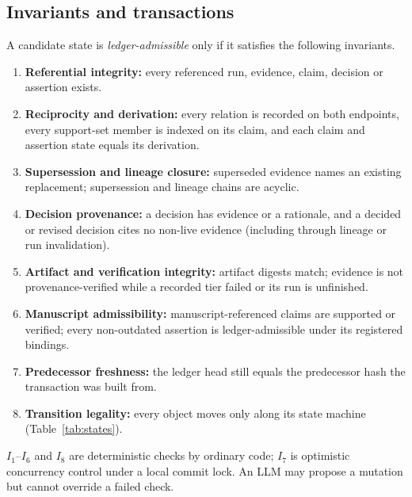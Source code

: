 \documentclass[cmc,article,submit,moreauthors,pdftex]{Definitions/tsp}
\begin{document}
\subsection{Invariants and transactions}
\label{sec:txn}
A candidate state is \emph{ledger-admissible} only if it satisfies the following invariants.
\begin{enumerate}
    \item[$I_1$] \textbf{Referential integrity:} every referenced run, evidence, claim, decision or assertion exists.
    \item[$I_2$] \textbf{Reciprocity and derivation:} every relation is recorded on both endpoints, every support-set member is indexed on its claim, and each claim and assertion state equals its derivation.
    \item[$I_3$] \textbf{Supersession and lineage closure:} superseded evidence names an existing replacement; supersession and lineage chains are acyclic.
    \item[$I_4$] \textbf{Decision provenance:} a decision has evidence or a rationale, and a decided or revised decision cites no non-live evidence (including through lineage or run invalidation).
    \item[$I_5$] \textbf{Artifact and verification integrity:} artifact digests match; evidence is not provenance-verified while a recorded tier failed or its run is unfinished.
    \item[$I_6$] \textbf{Manuscript admissibility:} manuscript-referenced claims are supported or verified; every non-outdated assertion is ledger-admissible under its registered bindings.
    \item[$I_7$] \textbf{Predecessor freshness:} the ledger head still equals the predecessor hash the transaction was built from.
    \item[$I_8$] \textbf{Transition legality:} every object moves only along its state machine (Table~\ref{tab:states}).
\end{enumerate}
$I_1$--$I_6$ and $I_8$ are deterministic checks by ordinary code; $I_7$ is optimistic concurrency control under a local commit lock. An LLM may propose a mutation but cannot override a failed check.
\end{document}
